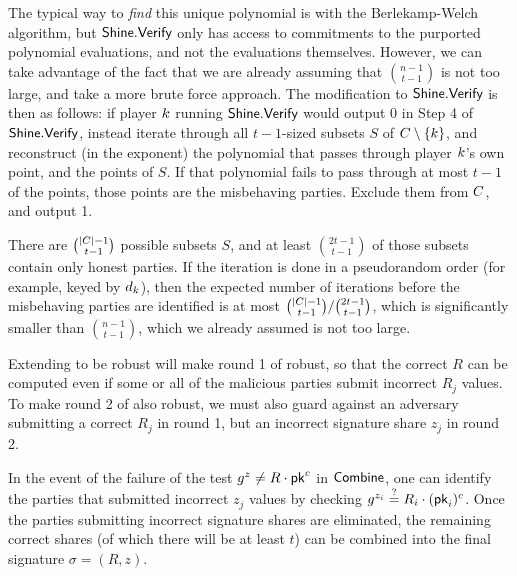 The typical way to \emph{find} this unique polynomial is with the
Berlekamp-Welch algorithm, but $\mathsf{Shine}.\mathsf{Verify}$ only has access to
commitments to the purported polynomial evaluations, and not the
evaluations themselves.  However, we can take advantage of the fact that
we are already assuming that ${n-1 \choose t-1}$ is not too large, and
take a more brute force approach.  The modification to
$\mathsf{Shine}.\mathsf{Verify}$ is then as follows: if player $k$ running
$\mathsf{Shine}.\mathsf{Verify}$ would output 0 in Step 4 of $\mathsf{Shine}.\mathsf{Verify}$, instead iterate
through all $t-1$-sized subsets $S$ of $C \setminus
\{k\}$, and reconstruct (in the exponent) the polynomial that
passes through player $k$'s own point, and the points of $S$.  If
that polynomial fails to pass through at most $t-1$ of the points, those
points are the misbehaving parties.  Exclude them from $C$, and
output 1.

There are ${|C|-1 \choose t-1}$ possible subsets $S$, and at
least ${2t-1 \choose t-1}$ of those subsets contain only honest parties.
If the iteration is done in a pseudorandom order (for example, keyed by
$d_k$), then the expected number of iterations before the misbehaving
parties are identified is at most ${|C|-1 \choose t-1} / {2t-1
\choose t-1}$, which is significantly smaller than ${n-1 \choose t-1}$,
which we already assumed is not too large.


Extending \DVRFOne to be robust will make round 1 of \glitter robust, so
that the correct $R$ can be computed even if some or all of the
malicious parties submit incorrect $R_j$ values.
To make round 2 of \glitter also robust, we must also guard against an
adversary submitting a correct $R_j$ in round 1, but an incorrect
signature share $z_j$ in round 2.

In the event of the failure of the test $g^z \neq R \cdot \mathsf{pk}^c$ in
$\mathsf{Combine}$, one can identify the parties that submitted incorrect
$z_j$ values by checking $g^{z_i} \stackrel{?}{=} R_i \cdot (\mathsf{pk}_i)^c$.  Once the
parties submitting incorrect signature shares are eliminated, the
remaining correct shares (of which there will be at least $t$) can be
combined into the final signature $\sigma=(R,z)$.

